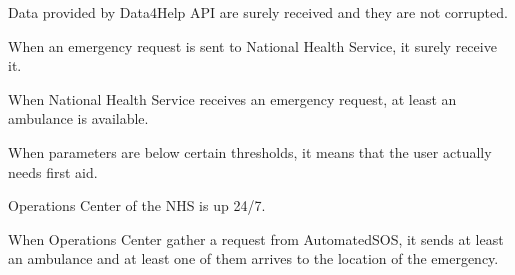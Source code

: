 \begin{enumerate} [resume, label={[D\arabic*]}]
    \item Data provided by Data4Help API are surely received and they are not corrupted.
    \item When an emergency request is sent to National Health Service, it surely receive it.
    \item When National Health Service receives an emergency request, at least an ambulance is available.
    \item When parameters are below certain thresholds, it means that the user actually needs first aid.
    \item Operations Center of the NHS is up 24/7.
    \item When Operations Center gather a request from AutomatedSOS, it sends at least an ambulance and at least one of them arrives to the location of the emergency.
\end{enumerate}

